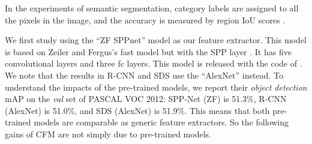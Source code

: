\documentclass[10pt,twocolumn,letterpaper]{article}
\begin{document}
In the experiments of semantic segmentation, category labels are assigned to all the pixels in the image, and the accuracy is measured by region IoU scores \cite{everingham2010pascal}.

We first study using the ``ZF SPPnet'' model \cite{he2014spatial} as our feature extractor. This model is based on Zeiler and Fergus's fast model \cite{zeiler2013visualizing} but with the SPP layer \cite{he2014spatial}. It has five convolutional layers and three fc layers. This model is released with the code of \cite{he2014spatial}. We note that the results in R-CNN \cite{girshick2013rich} and SDS \cite{hariharan2014simultaneous} use the ``AlexNet'' \cite{krizhevsky2012imagenet} instead. To understand the impacts of the pre-trained models, we report their \emph{object detection} mAP on the \emph{val} set of PASCAL VOC 2012: SPP-Net (ZF) is 51.3\%, R-CNN (AlexNet) is 51.0\%, and SDS (AlexNet) is 51.9\%. This means that both pre-trained models are comparable as generic feature extractors. So the following gains of CFM are not simply due to pre-trained models.
\end{document}
